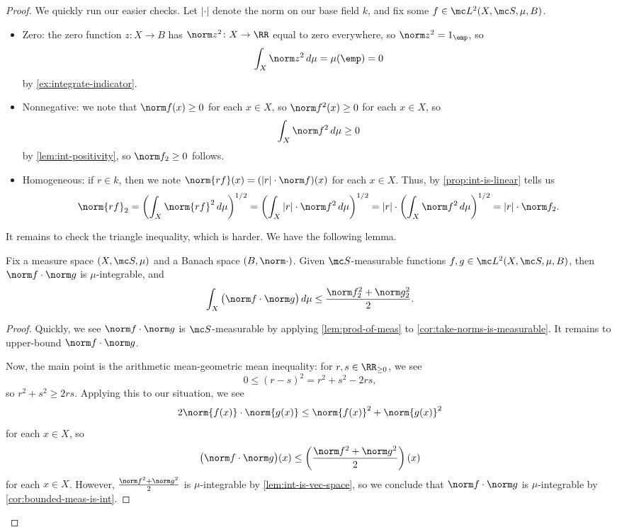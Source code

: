 \documentclass[../notes.tex]{subfiles}
\begin{document}
\begin{proof}
	We quickly run our easier checks. Let $|\cdot|$ denote the norm on our base field $k$, and fix some $f\in\mc L^2(X,\mc S,\mu,B)$.
	\begin{itemize}
		\item Zero: the zero function $z\colon X\to B$ has $\norm z^2\colon X\to\RR$ equal to zero everywhere, so $\norm z^2=1_\emp$, so
		\[\int_X\norm z^2\,d\mu=\mu(\emp)=0\]
		by \autoref{ex:integrate-indicator}.
		\item Nonnegative: we note that $\norm f(x)\ge0$ for each $x\in X$, so $\norm f^2(x)\ge0$ for each $x\in X$, so
		\[\int_X\norm f^2\,d\mu\ge0\]
		by \autoref{lem:int-positivity}, so $\norm f_2\ge0$ follows.
		\item Homogeneous: if $r\in k$, then we note $\norm{rf}(x)=(|r|\cdot\norm f)(x)$ for each $x\in X$. Thus, by \autoref{prop:int-is-linear} tells us
		\[\norm{rf}_2=\left(\int_X\norm{rf}^2\,d\mu\right)^{1/2}=\left(\int_X|r|\cdot\norm f^2\,d\mu\right)^{1/2}=|r|\cdot\left(\int_X\norm f^2\,d\mu\right)^{1/2}=|r|\cdot\norm f_2.\]
	\end{itemize}
	It remains to check the triangle inequality, which is harder. We have the following lemma.
	\begin{lemma} \label{lem:cs-ineq}
		Fix a measure space $(X,\mc S,\mu)$ and a Banach space $(B,\norm\cdot)$. Given $\mc S$-measurable functions $f,g\in\mc L^2(X,\mc S,\mu,B)$, then $\norm f\cdot\norm g$ is $\mu$-integrable, and
		\[\int_X\big(\norm f\cdot\norm g\big)\,d\mu\le\frac{\norm f_2^2+\norm g_2^2}2.\]
	\end{lemma}
	\begin{proof}
		Quickly, we see $\norm f\cdot\norm g$ is $\mc S$-measurable by applying \autoref{lem:prod-of-meas} to \autoref{cor:take-norms-is-measurable}. It remains to upper-bound $\norm f\cdot\norm g$.
		
		Now, the main point is the arithmetic mean-geometric mean inequality: for $r,s\in\RR_{\ge0}$, we see
		\[0\le(r-s)^2=r^2+s^2-2rs,\]
		so $r^2+s^2\ge2rs$. Applying this to our situation, we see
		\[2\norm {f(x)}\cdot\norm {g(x)}\le\norm {f(x)}^2+\norm {g(x)}^2\]
		for each $x\in X$, so
		\[\big(\norm f\cdot\norm g\big)(x)\le\left(\frac{\norm f^2+\norm g^2}2\right)(x)\]
		for each $x\in X$. However, $\frac{\norm f^2+\norm g^2}2$ is $\mu$-integrable by \autoref{lem:int-is-vec-space}, so we conclude that $\norm f\cdot\norm g$ is $\mu$-integrable by \autoref{cor:bounded-meas-is-int}.
		

\end{proof}
\end{proof}
\end{document}
